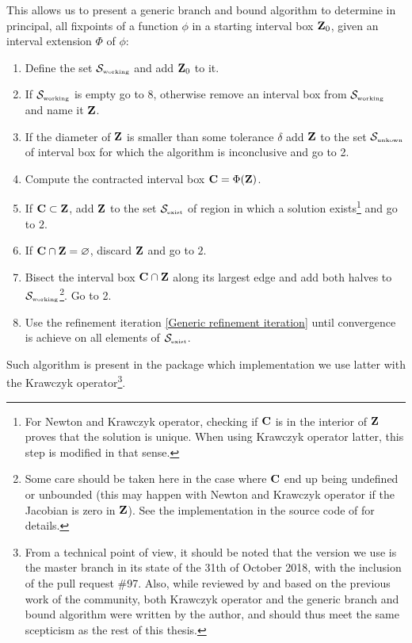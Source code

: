 \documentclass[
11pt, %
english, %
singlespacing, %
nolistspacing, %
liststotoc, %
headsepline, %
]{MastersDoctoralThesis} %
\begin{document}
This allows us to present a generic branch and bound algorithm to determine in principal, all fixpoints of a function $\phi$ in a starting interval box $\boldsymbol{\mathrm{Z}}_0$, given an interval extension $\Phi$ of $\phi$:
\begin{enumerate}
	\item Define the set $\mathcal{S}_{\text{\tiny working}}$ and add $\boldsymbol{\mathrm{Z}}_0$ to it.
	\item If $\mathcal{S}_{\text{\tiny working}}$ is empty go to 8, otherwise remove an interval box from $\mathcal{S}_{\text{\tiny working}}$ and name it $\boldsymbol{\mathrm{Z}}$.
	\item If the diameter of $\boldsymbol{\mathrm{Z}}$ is smaller than some tolerance $\delta$ add $\boldsymbol{\mathrm{Z}}$ to the set $\mathcal{S}_{\text{\tiny unkown}}$ of interval box for which the algorithm is inconclusive and go to 2.
	\item Compute the contracted interval box $\boldsymbol{\mathrm{C}} = \Phi(\boldsymbol{\mathrm{Z}})$.
	\item If $\boldsymbol{\mathrm{C}} \subset \boldsymbol{\mathrm{Z}}$, add $\boldsymbol{\mathrm{Z}}$ to the set $\mathcal{S}_{\text{\tiny exist}}$ of region in which a solution exists\footnote{For Newton and Krawczyk operator, checking if $\boldsymbol{\mathrm{C}}$ is in the interior of $\boldsymbol{\mathrm{Z}}$ proves that the solution is unique. When using Krawczyk operator latter, this step is modified in that sense.} and go to $2$.
	\item If $\boldsymbol{\mathrm{C}} \cap \boldsymbol{\mathrm{Z}} = \varnothing$, discard $\boldsymbol{\mathrm{Z}}$ and go to $2$.
	\item Bisect the interval box $\boldsymbol{\mathrm{C}} \cap \boldsymbol{\mathrm{Z}}$ along its largest edge and add both halves to $\mathcal{S}_{\text{\tiny working}}$\footnote{Some care should be taken here in the case where $\boldsymbol{\mathrm{C}}$ end up being undefined or unbounded (this may happen with Newton and Krawczyk operator if the Jacobian is zero in $\boldsymbol{\mathrm{Z}}$). See the implementation in the source code of \cite{intervalrootfinding} for details.}. Go to 2.
	\item Use the refinement iteration \eqref{Generic refinement iteration} until convergence is achieve on all elements of $\mathcal{S}_{\text{\tiny exist}}$.
\end{enumerate}

Such algorithm is present in the package  \cite{intervalrootfinding} which implementation we use latter with the Krawczyk operator\footnote{From a technical point of view, it should be noted that the version we use is the master branch in its state of the 31th of October 2018, with the inclusion of the pull request {\#}97. Also, while reviewed by and based on the previous work of the community, both Krawczyk operator and the generic branch and bound algorithm were written by the author, and should thus meet the same scepticism as the rest of this thesis.}.
\end{document}
